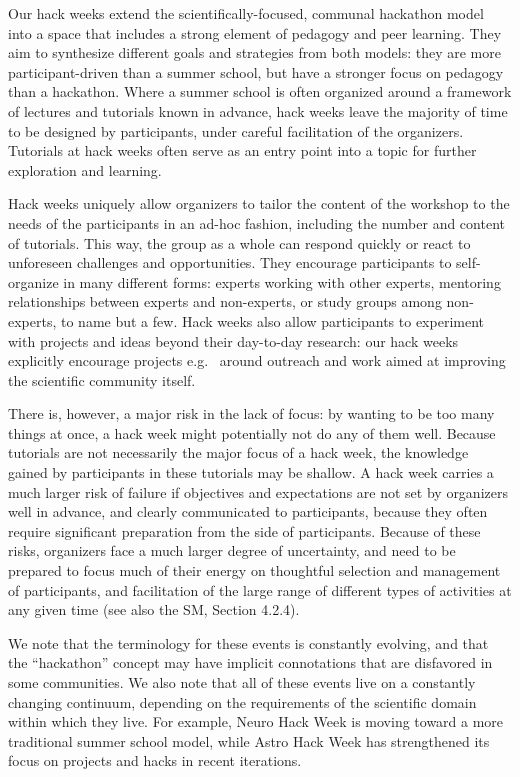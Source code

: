 Our hack weeks extend the scientifically-focused, communal hackathon model into a space that includes a strong element of pedagogy and peer learning. They aim to synthesize different goals and strategies from both models: they are more participant-driven than a summer school, but have a stronger focus on pedagogy than a hackathon. Where a summer school is often organized around a framework of lectures and tutorials known in advance, hack weeks leave the majority of time to be designed by participants, under careful facilitation of the organizers. Tutorials at hack weeks often serve as an entry point into a topic for further exploration and learning. %

Hack weeks uniquely allow organizers to tailor the content of the workshop to the needs of the participants in an ad-hoc fashion, including the number and content of tutorials. This way, the group as a whole can respond quickly or react to unforeseen challenges and opportunities. They encourage participants to self-organize in many different forms: experts working with other experts, mentoring relationships between experts and non-experts, or study groups among non-experts, to name but a few. Hack weeks also allow participants to experiment with projects and ideas beyond their day-to-day research: our hack weeks explicitly encourage projects e.g.~ around outreach and work aimed at improving the scientific community itself. 

There is, however, a major risk in the lack of focus: by wanting to be too many things at once, a hack week might potentially not do any of them well. Because tutorials are not necessarily the major focus of a hack week, the knowledge gained by participants in these tutorials may be shallow. A hack week carries a much larger risk of failure if objectives and expectations are not set by organizers well in advance, and clearly communicated to participants, because they often require significant preparation from the side of participants. 
Because of these risks, organizers face a much larger degree of uncertainty, and need to be prepared to focus much of their energy on thoughtful selection and management of participants, and facilitation of the large range of different types of activities at any given time (see also the SM, Section 4.2.4).

We note that the terminology for these events is constantly evolving, and that the ``hackathon'' concept may have implicit connotations that are disfavored in some communities. We also note that all of these events live on a constantly changing continuum, depending on the requirements of the scientific domain within which they live. For example, Neuro Hack Week is moving toward a more traditional summer school model, while Astro Hack Week has strengthened its focus on projects and hacks in recent iterations.
